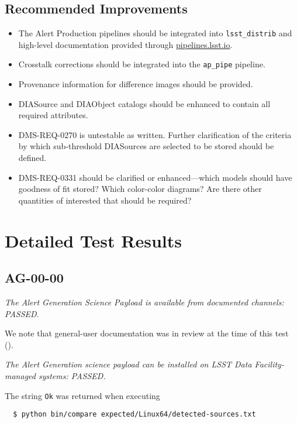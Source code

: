 \documentclass[DM,lsstdraft,STR,toc]{lsstdoc}
\begin{document}
\subsection{Recommended Improvements}
\label{sect:recommendations}

\begin{itemize}

    \item{The Alert Production pipelines should be integrated into \texttt{lsst\_distrib} and high-level documentation provided through \url{pipelines.lsst.io}.}
    \item{Crosstalk corrections should be integrated into the \texttt{ap\_pipe} pipeline.}
    \item{Provenance information for difference images should be provided.}
    \item{DIASource and DIAObject catalogs should be enhanced to contain all required attributes.}
    \item{DMS-REQ-0270 is untestable as written.
        Further clarification of the criteria by which sub-threshold
        DIASources are selected to be stored should be defined.}
    \item{DMS-REQ-0331 should be clarified or enhanced---which models should have goodness of fit stored?  Which color-color diagrams?  Are there other quantities of interested that should be required?}

\end{itemize}

\section{Detailed Test Results}
\label{sect:detailed}

\subsection{AG-00-00}
\label{sect:ag-00-00}

\textit{The Alert Generation Science Payload is available from documented channels: PASSED.}

We note that general-user documentation was in review at the time of this test ().

\textit{The Alert Generation science payload can be installed on LSST Data Facility-managed systems: PASSED.}

The string \texttt{Ok} was returned when executing

\begin{verbatim}
  $ python bin/compare expected/Linux64/detected-sources.txt
\end{verbatim}
\end{document}
